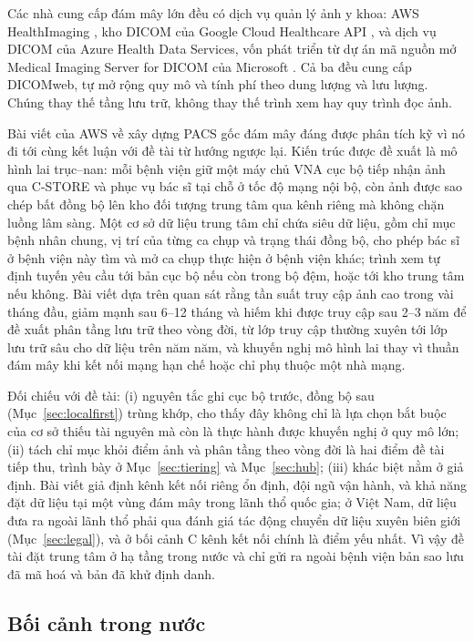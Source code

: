 Các nhà cung cấp đám mây lớn đều có dịch vụ quản lý ảnh y khoa: AWS HealthImaging
\cite{awshealthimaging}, kho DICOM của Google Cloud Healthcare API
\cite{gcphealthcare}, và dịch vụ DICOM của Azure Health Data Services, vốn phát
triển từ dự án mã nguồn mở Medical Imaging Server for DICOM của Microsoft
\cite{msdicom}. Cả ba đều cung cấp DICOMweb, tự mở rộng quy mô và tính phí theo
dung lượng và lưu lượng. Chúng thay thế tầng lưu trữ, không thay thế trình xem
hay quy trình đọc ảnh.

Bài viết của AWS về xây dựng PACS gốc đám mây \cite{awspacs2026} đáng được phân
tích kỹ vì nó đi tới cùng kết luận với đề tài từ hướng ngược lại. Kiến trúc được đề
xuất là mô hình lai trục--nan: mỗi bệnh viện giữ một máy chủ VNA cục bộ tiếp nhận
ảnh qua C-STORE và phục vụ bác sĩ tại chỗ ở tốc độ mạng nội bộ, còn ảnh được sao
chép bất đồng bộ lên kho đối tượng trung tâm qua kênh riêng mà không chặn luồng lâm
sàng. Một cơ sở dữ liệu trung tâm chỉ chứa siêu dữ liệu, gồm chỉ mục bệnh nhân
chung, vị trí của từng ca chụp và trạng thái đồng bộ, cho phép bác sĩ ở bệnh viện
này tìm và mở ca chụp thực hiện ở bệnh viện khác; trình xem tự định tuyến yêu cầu
tới bản cục bộ nếu còn trong bộ đệm, hoặc tới kho trung tâm nếu không. Bài viết
dựa trên quan sát rằng tần suất truy cập ảnh cao trong vài tháng đầu, giảm mạnh sau
6--12 tháng và hiếm khi được truy cập sau 2--3 năm để đề xuất phân tầng lưu trữ theo
vòng đời, từ lớp truy cập thường xuyên tới lớp lưu trữ sâu cho dữ liệu trên năm năm,
và khuyến nghị mô hình lai thay vì thuần đám mây khi kết nối mạng hạn chế hoặc chỉ
phụ thuộc một nhà mạng.

Đối chiếu với đề tài: (i) nguyên tắc ghi cục bộ trước, đồng bộ sau
(Mục~\ref{sec:localfirst}) trùng khớp, cho thấy đây không chỉ là lựa chọn bắt buộc
của cơ sở thiếu tài nguyên mà còn là thực hành được khuyến nghị ở quy mô lớn; (ii)
tách chỉ mục khỏi điểm ảnh và phân tầng theo vòng đời là hai điểm đề tài tiếp thu,
trình bày ở Mục~\ref{sec:tiering} và Mục~\ref{sec:hub}; (iii) khác biệt nằm ở giả
định. Bài viết giả định kênh kết nối riêng ổn định, đội ngũ vận hành, và khả năng đặt
dữ liệu tại một vùng đám mây trong lãnh thổ quốc gia; ở Việt Nam, dữ liệu đưa ra
ngoài lãnh thổ phải qua đánh giá tác động chuyển dữ liệu xuyên biên giới
(Mục~\ref{sec:legal}), và ở bối cảnh C kênh kết nối chính là điểm yếu nhất. Vì vậy
đề tài đặt trung tâm ở hạ tầng trong nước và chỉ gửi ra ngoài bệnh viện bản sao lưu
đã mã hoá và bản đã khử định danh.


\subsection{Bối cảnh trong nước}


